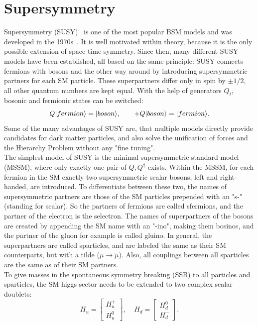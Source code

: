 \section{Supersymmetry}\label{sec:SUSY}
Supersymmetry (SUSY)~\cite{SUSYOriginal,SUSYPrimer} is one of the most popular BSM models and was developed in the 1970s~\cite{SUSYTheorem,HAAG1975257}. It is well motivated within theory, because it is the only possible extension of space time symmetry. Since then, many different SUSY models have been established, all based on the same principle: SUSY connects fermions with bosons and the other way around by introducing supersymmetric partners for each SM particle. These superpartners differ only in spin by $\pm1/2$, all other quantum numbers are kept equal. With the help of generators $Q_i$, bosonic and fermionic states can be switched:
\begin{equation}
 Q\lvert fermion\rangle=\lvert boson\rangle,~~~~~~+ Q\lvert boson\rangle=\lvert fermion\rangle.
\end{equation}
Some of the many advantages of SUSY are, that multiple models directly provide candidates for dark matter particles, and also solve the unification of forces and the Hierarchy Problem without any "fine tuning".\\
The simplest model of SUSY is the minimal supersymmetric standard model (MSSM), where only exactly one pair of $Q,Q^{\dagger}$ exists. Within the MSSM, for each fermion in the SM exactly two supersymmetric scalar bosons, left and right-handed, are introduced. To differentiate between these two, the names of supersymmetric partners are those of the SM particles prepended with an "s-" (standing for scalar). So the partners of fermions are called sfermions, and \eg the partner of the electron is the selectron. The names of superpartners of the bosons are created by appending the SM name with an "-ino", making them bosinos, and the partner of the gluon for example is called gluino. In general, the superpartners are called sparticles, and are labeled the same as their SM counterparts, but with a tilde ($\mu \to \widetilde{\mu}$). Also, all couplings between all sparticles are the same as of their SM partners.\\
To give masses in the spontaneous symmetry breaking (SSB) to all particles and sparticles, the SM higgs sector needs to be extended to two complex scalar doublets:
\begin{equation}
 H_u=  \left[
  \begin{matrix}
   H_u^+ \\
   H_u^0
  \end{matrix}
  \right],~~~~~
 H_d=  \left[
  \begin{matrix}
   H_d^0 \\
   H_d^-
  \end{matrix}
  \right].
\end{equation}
